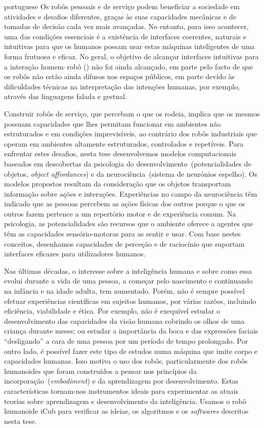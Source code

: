 
\begin{otherlanguage*}{portuguese}
Os robôs pessoais e de serviço podem beneficiar a sociedade em atividades e desafios diferentes, graças às suas capacidades mecânicas e de tomadas de decisão cada vez mais avançadas.
No entanto, para isso acontecer, uma das condições essenciais é a existência de interfaces coerentes, naturais e intuitivas para que os humanos possam usar estas máquinas inteligentes de uma forma frutuosa e eficaz.
No geral, o objetivo de alcançar interfaces intuitivas para a interação homem--robô (\emph{\hri}) não foi ainda alcançado, em parte pelo facto de que os robôs não estão ainda difusos nos espaços públicos, em parte devido às dificuldades técnicas na interpretação das intenções humanas, por exemplo, através das linguagens falada e gestual.

Construir robôs de serviço, que percebam o que os rodeia, implica que os mesmos possuam capacidades que lhes permitam funcionar em ambientes não estruturados e em condições imprevisíveis, ao contrário dos robôs industriais que operam em ambientes altamente estruturados, controlados e repetíveis.
Para enfrentar estes desafios, nesta tese desenvolvemos modelos computacionais baseados em descobertas da psicologia do desenvolvimento~(potencialidades de objetos, \emph{object affordances}) e da neurociência~(sistema de neurónios espelho).
Os modelos propostos resultam da consideração que os objetos transportam informação sobre ações e interações.
Experiências no campo da neurociência têm indicado que as pessoas percebem as ações físicas dos outros porque o que os outros fazem pertence a um repertório motor e de experiência comum.
Na psicologia, as potencialidades são recursos que o ambiente oferece a agentes que têm as capacidades sensório-motoras para as sentir e usar.
Com base nestes conceitos, desenhamos capacidades de perceção e de raciocínio que suportam interfaces eficazes para utilizadores humanos.

Nas últimas décadas, o interesse sobre a inteligência humana e sobre como essa evolui durante a vida de uma pessoa, a começar pelo nascimento e continuando na infância e na idade adulta, tem aumentado.
Porém, não é sempre possível efetuar experiências científicas em sujeitos humanos, por várias razões, incluindo eficiência, viabilidade e ética.
Por exemplo, não é exequível estudar o desenvolvimento das capacidades da visão humana cobrindo os olhos de uma criança durante meses; ou estudar a importância da boca e das expressões faciais ``desligando'' a cara de uma pessoa por um período de tempo prolongado.
Por outro lado, é possível fazer este tipo de estudos numa máquina que imite corpo e capacidades humanas.
Isso motiva o uso dos robôs, particularmente dos robôs humanoides que foram construídos a pensar nos princípios da incorporação~(\emph{embodiment}) e da aprendizagem por desenvolvimento.
Estas características tornam-nos instrumentos ideais para experimentar as atuais teorias sobre aprendizagem e desenvolvimento da inteligência.
Usamos o robô humanoide iCub para verificar as ideias, os algoritmos e os \emph{softwares} descritos nesta tese.


\end{otherlanguage*}
